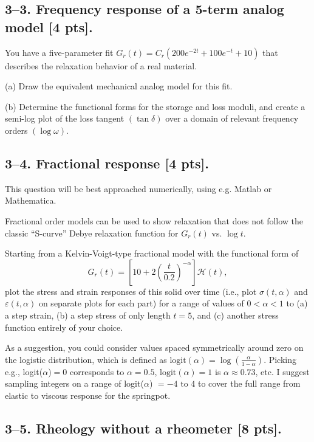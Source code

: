 \subsection*{3--3. \textbf{Frequency response of a 5-term analog model} [4 pts].}
You have a five-parameter fit $G_r(t) = C_r (200 e^{-2t} + 100 e^{-t} + 10)$ that describes the relaxation behavior of a real material. 

(a) Draw the equivalent mechanical analog model for this fit.

(b) Determine the functional forms for the storage and loss moduli, and create a semi-log plot of the loss tangent $(\tan\delta)$ over a domain of relevant frequency orders $(\log \omega)$. 

\newpage
\subsection*{3--4. \textbf{Fractional response} [4 pts].}

This question will be best approached numerically, using e.g. Matlab or Mathematica. 

Fractional order models can be used to show relaxation that does not follow the classic ``S-curve'' Debye relaxation function for $G_r(t)$ vs. $\log t$. 

Starting from a Kelvin-Voigt-type fractional model with the functional form of 
\begin{equation*}
    G_r(t) = \left[10 + 2\left(\frac{t}{0.2} \right)^{-\alpha}\right] \mathcal{H}(t),
\end{equation*}
plot the stress and strain responses of this solid over time (i.e., plot $\sigma(t,\alpha)$ and $\varepsilon(t,\alpha)$ on separate plots for each part) for a range of values of $0<\alpha<1$ to (a) a step strain, (b) a step stress of only length $t=5$, and (c) another stress function entirely of your choice. 

As a suggestion, you could consider values spaced symmetrically around zero on the logistic distribution, which is defined as $\textrm{logit}(\alpha) = \log\left(\frac{\alpha}{1-\alpha} \right)$. 
Picking e.g., logit($\alpha$)$=0$ corresponds to $\alpha =0.5$, $\textrm{logit}(\alpha) =  1$ is $\alpha\approx0.73$, etc. 
I suggest sampling integers on a range of logit($\alpha$) $= -4 \textrm{~to~} 4$ to cover the full range from elastic to viscous response for the springpot.

\bigskip
\bigskip
\subsection*{3--5. \textbf{Rheology without a rheometer} [8 pts].}

